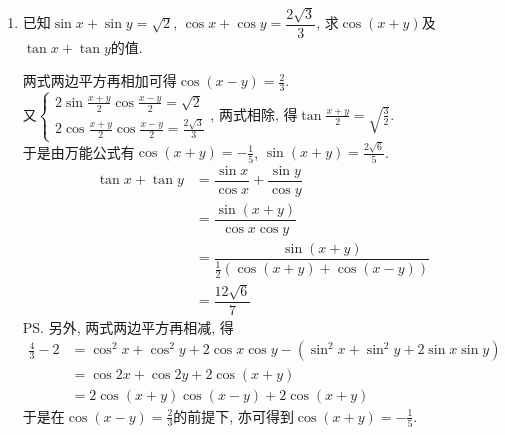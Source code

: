 \begin{enumerate}
\begin{jieda}
\begin{enumerate}[(1)]
\item 
\begin{align*}
\LHS & = 2\sin\dfrac{A+B}{2}\cos\dfrac{A-B}{2}+2\sin\dfrac{C}{2}\cos\dfrac{C}{2}\\
& = 2\cos\dfrac{C}{2}\left(\cos\dfrac{A-B}{2}+\sin\dfrac{C}{2}\right)\\
& = 2\cos\dfrac{C}{2}\left(\cos\dfrac{A-B}{2}+\cos\dfrac{A+B}{2}\right)\\
& = 4\cos\dfrac{A}{2}\cos\dfrac{B}{2}\cos\dfrac{C}{2}
\end{align*}
\end{enumerate}
\ps 展一(去掉一角)留二(保留两角)是基本思路. 
\end{jieda}


\item 已知$\sin{x}+\sin{y}=\sqrt{2}$, $\cos{x}+\cos{y}=\dfrac{2\sqrt{3}}{3}$, 求$\cos(x+y)$及$\tan{x}+\tan{y}$的值. 
\begin{jieda}
两式两边平方再相加可得$\cos(x-y)=\frac{2}{3}$. \\
又$\begin{cases}
2\sin\frac{x+y}{2}\cos\frac{x-y}{2}=\sqrt{2}\\
2\cos\frac{x+y}{2}\cos\frac{x-y}{2}=\frac{2\sqrt{3}}{3}
\end{cases}$, 两式相除, 得$\tan\frac{x+y}{2}=\sqrt{\frac{3}{2}}$. \\
于是由万能公式有$\cos(x+y)=-\frac{1}{5}$, $\sin(x+y)=\frac{2\sqrt{6}}{5}$. 
\begin{align*}
\tan{x}+\tan{y} & = \dfrac{\sin{x}}{\cos{x}}+\dfrac{\sin{y}}{\cos{y}}\\
& = \dfrac{\sin(x+y)}{\cos{x}\cos{y}}\\
& = \dfrac{\sin(x+y)}{\frac{1}{2}(\cos(x+y)+\cos(x-y))}\\
& = \dfrac{12\sqrt{6}}{7}
\end{align*}
\ps 另外, 两式两边平方再相减, 得
\begin{align*}
\frac{4}{3}-2
& = \cos^2x+\cos^2y+2\cos{x}\cos{y}-(\sin^2x+\sin^2y+2\sin{x}\sin{y})\\
& = \cos2x+\cos2y+2\cos(x+y)\\
& = 2\cos(x+y)\cos(x-y)+2\cos(x+y)
\end{align*}
于是在$\cos(x-y)=\frac{2}{3}$的前提下, 亦可得到$\cos(x+y)=-\frac{1}{5}$. 
\end{jieda}



\end{enumerate}

